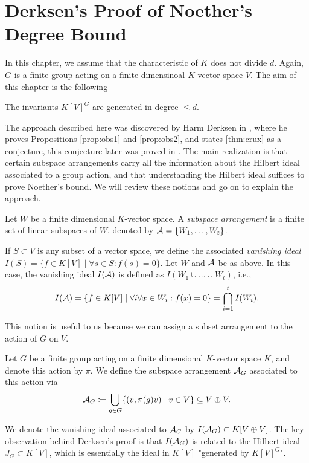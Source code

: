 \documentclass[../main.tex]{subfiles}
\begin{document}
\section{Derksen's Proof of Noether's Degree Bound}
In this chapter, we assume that the characteristic of $K$ does not divide $d$. 
Again, $G$ is a finite group acting on a finite dimensinoal $K$-vector space $V$.
The aim of this chapter is the following
\begin{thm}\label{thm:generalNoether}
    The invariants $K[V]^G$ are generated in degree $\leq d$.
\end{thm}

The approach described here was discovered by Harm Derksen in
\cite{DERKSENProofIdea}, where he proves Propositions \ref{prop:obs1} and 
\ref{prop:obs2}, and states \ref{thm:crux} as a conjecture, 
this conjecture later was proved in \cite{DERKSENRegularity}. 
The main realization is
that certain subspace arrangements carry all the information about the Hilbert ideal
associated to a group action, and that understanding the Hilbert ideal suffices to
prove Noether's bound. We will review these notions and go on to explain the 
approach.

\begin{defi}
    Let $W$ be a finite dimensional $K$-vector space. A \emph{subspace
    arrangement} is a finite set of linear subspaces of $W$, denoted by $\mathcal{A} =
    \{W_1, \dots, W_t\}$. 
\end{defi}

\begin{defi}
    If $S \subset V$ is any subset of a vector space, we define the associated
    \emph{vanishing ideal}
    $I(S) = \{f \in K[V] \mid \forall s \in S: f(s) = 0\}$.
    Let $W$ and $\mathcal{A}$ be as above. In this case, the vanishing ideal $I(\mathcal{A})$
    is defined as $I(W_1 \cup \dots \cup W_t)$, i.e.,
    \begin{equation*}
        I(\mathcal{A}) = \{f \in K[V] \mid \forall i \forall x \in W_i: f(x) = 0\} =
        \bigcap_{i=1}^t I(W_i).
    \end{equation*}
\end{defi}

This notion is useful to us because we can assign a subset arrangement to the
action of $G$ on $V$.
\begin{defi}
    Let $G$ be a finite group acting on a finite dimensional $K$-vector space $K$, 
    and denote this action by $\pi$.
    We define the subspace arrangement $\mathcal{A}_G$ associated to this action via
    \begin{equation*}
        \mathcal{A}_G \coloneqq \bigcup_{g \in G}\{(v,\pi(g)v) \mid v \in V\}
        \subseteq V \oplus V.
    \end{equation*}
\end{defi}
We denote the vanishing ideal associated to $\mathcal{A}_G$ by $I(\mathcal{A}_G) \subset K[V \oplus V]$. 
The key observation behind Derksen's proof is that $I(\mathcal{A}_G)$ is related to the Hilbert ideal
$J_G \subset K[V]$, which is essentially the ideal in $K[V]$ "generated by $K[V]^G$".
\end{document}
